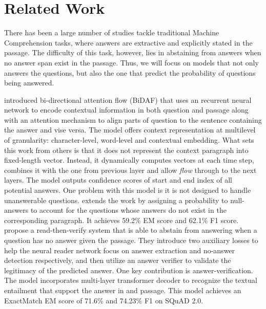 \section{Related Work}

There has been a large number of studies tackle traditional Machine Comprehension tasks, where answers are extractive and explicitly stated in the passage. The difficulty of this task, however, lies in abstaining from answers when no answer span exist in the passage. Thus, we will focus on models that not only answers the questions, but also the one that predict the probability of questions being answered.  


\cite{DBLP:journals/corr/SeoKFH16} introduced bi-directional attention flow (BiDAF) that uses an recurrent neural network to encode contextual information in both question and passage along with an attention mechanism to align parts of question to the sentence containing the answer and vise versa. The model offers context representation at multilevel of granularity: character-level, word-level and contextual embedding. What sets this work from others is that it does not represent the context paragraph into fixed-length vector. Instead, it dynamically computes vectors at each time step, combines it with the one from previous layer and allow \textit{flow} through to the next layers. The model outputs confidence scores of start and end index of all potential answers. One problem with this model is it is not designed to handle unanswerable questions. \citep{DBLP:journals/corr/LevySCZ17} extends the work by assigning a probability to null-answers to account for the questions whose answers do not exist in the corresponding paragraph. It achieves 59.2\% EM score and 62.1\% F1 score.\\

\citep{DBLP:journals/corr/abs-1808-05759} propose a read-then-verify system that is able to abstain from answering when a question has no answer given the passage. They introduce two auxiliary losses to help the neural reader network focus on answer extraction and no-answer detection respectively, and then utilize an answer verifier to validate the legitimacy of the predicted answer. One key contribution is answer-verification. The model incorporates multi-layer transformer decoder to recognize the textual entailment that support the answer in and passage. This model achieves an ExactMatch EM score of 71.6\% and 74.23\% F1 on SQuAD 2.0. \\

